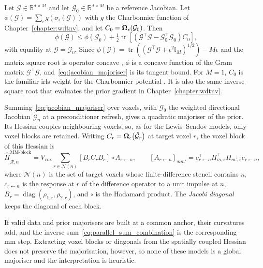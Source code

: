 Let $\mathcal{G}\in\mathbb{R}^{d\times M}$ and let $\mathcal{G}_0\in\mathbb{R}^{d\times M}$ be a reference Jacobian. Let $\phi(\mathcal{G})=\sum_{i}g(\sigma_i(\mathcal{G}))$ with $g$ the Charbonnier function of Chapter~\ref{chapter:wdtnv}, and let $C_0=\bm{\Omega}_{\epsilon}\!\left(\mathcal{G}_0\right)$. Then
\begin{equation}
    \phi(\mathcal{G})
    \leq
    \phi(\mathcal{G}_0)
    +\tfrac12\operatorname{tr}\!\left[\left(\mathcal{G}^\top \mathcal{G}-\mathcal{G}_0^\top \mathcal{G}_0\right)C_0\right],
    \label{eq:jacobian_majoriser}
\end{equation}
with equality at $\mathcal{G}=\mathcal{G}_0$. Since $\phi(\mathcal{G})=\operatorname{tr}((\mathcal{G}^\top \mathcal{G}+\epsilon^2\mathbb{I}_M)^{1/2})-M\epsilon$ and the matrix square root is operator concave \cite{bhatiaMatrixAnalysis1997a}, $\phi$ is a concave function of the Gram matrix $\mathcal{G}^\top \mathcal{G}$, and~\eqref{eq:jacobian_majoriser} is its tangent bound. For $M=1$, $C_0$ is the familiar \gls{irls} weight for the Charbonnier potential \cite{fessler_image_2017,charbonnier_deterministic_1997}. It is also the same inverse square root that evaluates the prior gradient in Chapter~\ref{chapter:wdtnv}.

Summing~\eqref{eq:jacobian_majoriser} over voxels, with $\mathcal{G}_0$ the weighted directional Jacobian $\tilde{\mathcal G}_n$ at a preconditioner refresh, gives a quadratic majoriser of the prior. Its Hessian couples neighbouring voxels, so, as for the Lewis--Sendov models, only voxel blocks are retained. Writing $C_r=\bm{\Omega}_{\epsilon}\!\left(\tilde{\mathcal G}_r\right)$ at target voxel $r$, the voxel block of this Hessian is
\begin{equation}
    \widehat H_{\widetilde{\mathcal R},n}^{\mathrm{MM\text{-}block}}
    =
    V_{\mathrm{vox}}
    \sum_{r\in\mathcal N(n)}
    \left[B_rC_rB_r\right]\circ A_{r\leftarrow n},
    \qquad
    [A_{r\leftarrow n}]_{mm'}
    =
    c_{r\leftarrow n}^\top\Pi_{m,r}^\top\Pi_{m',r}c_{r\leftarrow n},
    \label{eq:mm_block_preconditioner}
\end{equation}
where $\mathcal N(n)$ is the set of target voxels whose finite-difference stencil contains $n$, $c_{r\leftarrow n}$ is the response at $r$ of the difference operator to a unit impulse at $n$, $B_r=\operatorname{diag}(\rho_{1,r},\rho_{2,r})$, and $\circ$ is the Hadamard product. The \emph{Jacobi diagonal} keeps the diagonal of each block.

If valid data and prior majorisers are built at a common anchor, their curvatures add, and the inverse sum~\eqref{eq:parallel_sum_combination} is the corresponding \gls{mm} step. Extracting voxel blocks or diagonals from the spatially coupled Hessian does not preserve the majorisation, however, so none of these models is a global majoriser and the interpretation is heuristic.

